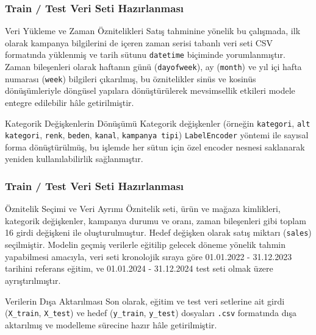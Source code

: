\documentclass[12pt]{beamer}
\begin{document}
	
	
	
	\begin{frame}
		\frametitle{Train / Test Veri Seti Hazırlanması}
		\begin{block}{Veri Yükleme ve Zaman Öznitelikleri}
			Satış tahminine yönelik bu çalışmada, ilk olarak kampanya bilgilerini de içeren zaman serisi tabanlı veri seti CSV formatında yüklenmiş ve tarih sütunu \texttt{datetime} biçiminde yorumlanmıştır. Zaman bileşenleri olarak haftanın günü (\texttt{dayofweek}), ay (\texttt{month}) ve yıl içi hafta numarası (\texttt{week}) bilgileri çıkarılmış, bu öznitelikler sinüs ve kosinüs dönüşümleriyle döngüsel yapılara dönüştürülerek mevsimsellik etkileri modele entegre edilebilir hâle getirilmiştir.
		\end{block}
		
		\vspace{0.5em}
		
		\begin{block}{Kategorik Değişkenlerin Dönüşümü}
			Kategorik değişkenler (örneğin \texttt{kategori}, \texttt{alt kategori}, \texttt{renk}, \texttt{beden}, \texttt{kanal}, \texttt{kampanya tipi}) \texttt{LabelEncoder} yöntemi ile sayısal forma dönüştürülmüş, bu işlemde her sütun için özel encoder nesnesi saklanarak yeniden kullanılabilirlik sağlanmıştır.
		\end{block}
	\end{frame}
	
	\begin{frame}
		\frametitle{Train / Test Veri Seti Hazırlanması}
		\begin{block}{Öznitelik Seçimi ve Veri Ayrımı}
			Öznitelik seti, ürün ve mağaza kimlikleri, kategorik değişkenler, kampanya durumu ve oranı, zaman bileşenleri gibi toplam 16 girdi değişkeni ile oluşturulmuştur. Hedef değişken olarak satış miktarı (\texttt{sales}) seçilmiştir. Modelin geçmiş verilerle eğitilip gelecek döneme yönelik tahmin yapabilmesi amacıyla, veri seti kronolojik sıraya göre 01.01.2022 - 31.12.2023 tarihini referans eğitim, ve 01.01.2024 - 31.12.2024 test seti olmak üzere ayrıştırılmıştır.
		\end{block}
		
		\vspace{0.5em}
		
		\begin{block}{Verilerin Dışa Aktarılması}
			Son olarak, eğitim ve test veri setlerine ait girdi (\texttt{X\_train}, \texttt{X\_test}) ve hedef (\texttt{y\_train}, \texttt{y\_test}) dosyaları \texttt{.csv} formatında dışa aktarılmış ve modelleme sürecine hazır hâle getirilmiştir.
		\end{block}
	\end{frame}
	
\end{document}
